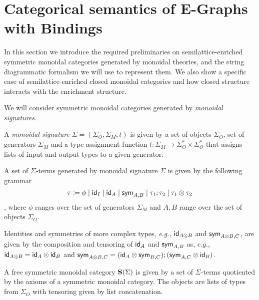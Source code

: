 \section{Categorical semantics of E-Graphs with Bindings}

In this section we introduce the required preliminaries on semilattice-enriched symmetric monoidal categories generated by monoidal theories, and the string diagrammatic formalism we will use to represent them.
We also show a specific case of semilattice-enriched closed monoidal categories and how closed structure interacts with the enrichment structure.

We will consider symmetric monoidal categories generated by \textit{monoidal signatures}.

\begin{definition}

A \textit{monoidal} \textit{signature} $\Sigma = (\Sigma_{O}, \Sigma_{M}, t)$ is given by a set of objects $\Sigma_{O}$, set of generators $\Sigma_{M}$ and a type assignment function $t : \Sigma_{M} \to \Sigma_{O}^{*} \times \Sigma_{O}^{*}$ that assigns lists of input and output types to a given generator.
\end{definition}

\begin{definition}

A set of $\Sigma$-terms generated by monoidal signature $\Sigma$ is given by the following grammar
\[
\tau \coloneqq \phi \;|\; \textsf{id}_{I} \;|\; \textsf{id}_{A} \;|\; \textsf{sym}_{A,B} \;|\; \tau_{1};\tau_{2} \;|\; \tau_{1} \otimes \tau_{2}
\],
where $\phi$ ranges over the set of generators $\Sigma_{M}$ and $A,B$ range over the set of objects $\Sigma_{O}$.
\end{definition}

Identities and symmetries of more complex types, \textit{e.g.}, $\textsf{id}_{A \otimes B}$ and $\textsf{sym}_{A \otimes B, C}$, are given by the composition and tensoring of $\textsf{id}_{A}$ and $\textsf{sym}_{A,B}$ as, $\textit{e.g.}$, $\textsf{id}_{A \otimes B} = \textsf{id}_{A} \otimes \textsf{id}_{B}$ and $\textsf{sym}_{A \otimes B, C} = (\textsf{id}_{A} \otimes \textsf{sym}_{B,C});(\textsf{sym}_{A,C} \otimes \textsf{id}_{B})$.

\begin{definition}
A free symmetric monoidal category $\mathbf{S}(\Sigma)$ is given by a set of $\Sigma$-terms quotiented by the axioms of a symmetric monoidal category.
The objects are lists of types from $\Sigma_{O}$ with tensoring given by list concatenation.
\end{definition}

